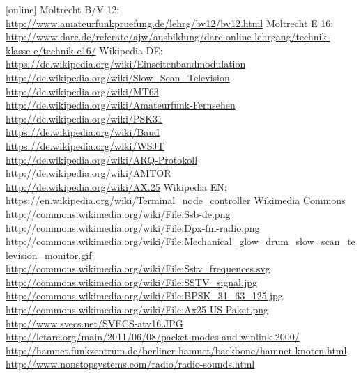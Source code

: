 \begin{thebibliography}{}
    [online]
      Moltrecht B/V 12: \\
                    \url{http://www.amateurfunkpruefung.de/lehrg/bv12/bv12.html}
       Moltrecht E 16: \\
                    \url{http://www.darc.de/referate/ajw/ausbildung/darc-online-lehrgang/technik-klasse-e/technik-e16/}
        Wikipedia DE: \\
                    \url{https://de.wikipedia.org/wiki/Einseitenbandmodulation}\\
                    \url{http://de.wikipedia.org/wiki/Slow_Scan_Television}\\
                    \url{http://de.wikipedia.org/wiki/MT63}\\
                    \url{http://de.wikipedia.org/wiki/Amateurfunk-Fernsehen}\\
                    \url{http://de.wikipedia.org/wiki/PSK31}\\
                    \url{https://de.wikipedia.org/wiki/Baud}\\
                    \url{https://de.wikipedia.org/wiki/WSJT}\\
                    \url{http://de.wikipedia.org/wiki/ARQ-Protokoll}\\
                    \url{http://de.wikipedia.org/wiki/AMTOR}\\
                    \url{http://de.wikipedia.org/wiki/AX.25}
        Wikipedia EN: \\
                    \url{https://en.wikipedia.org/wiki/Terminal_node_controller}
        Wikimedia Commons \\
                    \url{http://commons.wikimedia.org/wiki/File:Ssb-de.png}\\
                    \url{http://commons.wikimedia.org/wiki/File:Dpx-fm-radio.png}\\
                    \url{http://commons.wikimedia.org/wiki/File:Mechanical_glow_drum_slow_scan_television_monitor.gif}\\
                    \url{http://commons.wikimedia.org/wiki/File:Sstv_frequences.svg}\\
                    \url{http://commons.wikimedia.org/wiki/File:SSTV_signal.jpg}\\
                    \url{http://commons.wikimedia.org/wiki/File:BPSK_31_63_125.jpg}\\
                    \url{http://commons.wikimedia.org/wiki/File:Ax25-US-Paket.png}
       \url{http://www.svecs.net/SVECS-atv16.JPG}
      \url{http://letarc.org/main/2011/06/08/packet-modes-and-winlink-2000/}
    \url{http://hamnet.funkzentrum.de/berliner-hamnet/backbone/hamnet-knoten.html}
       \url{http://www.nonstopsystems.com/radio/radio-sounds.html}

\end{thebibliography} 


